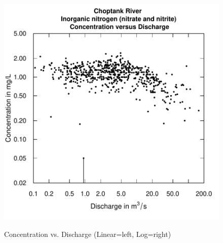 \documentclass[a4paper,11pt]{article}
\begin{document}
\begin{figure}[htbp]
\begin{minipage}[h]{0.5\linewidth}
\begin{center}
\includegraphics{EGRET-figplotLogConcQ}
    \label{fig:plotLogConcQ}
    \end{center}
  \end{minipage}
  \caption{Concentration vs. Discharge (Linear=left, Log=right) }
  \label{fig:plotLogConcQANDplotConcQ}
\end{figure}
\end{document}
